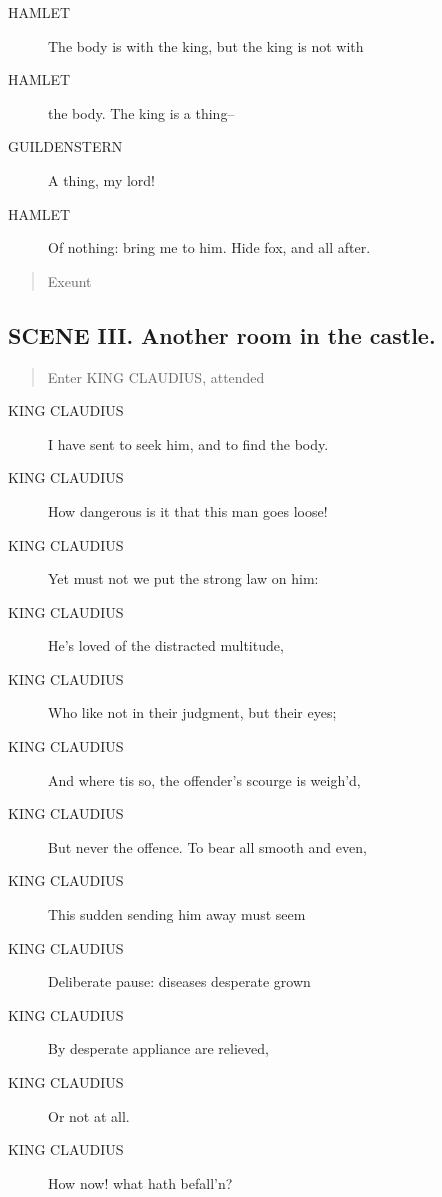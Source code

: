\documentclass{article}
\begin{document}
\begin{description}
            
\item[HAMLET] The body is with the king, but the king is not with
\item[HAMLET] the body. The king is a thing--
\end{description}
          
\begin{description}
            
\item[GUILDENSTERN] A thing, my lord!
\end{description}
          
\begin{description}
            
\item[HAMLET] Of nothing: bring me to him. Hide fox, and all after.
\end{description}
          
\begin{quote}
Exeunt
\end{quote}
          
\subsection{SCENE III.  Another room in the castle.}
          
\begin{quote}
Enter KING CLAUDIUS, attended
\end{quote}
          
\begin{description}
            
\item[KING CLAUDIUS] I have sent to seek him, and to find the body.
\item[KING CLAUDIUS] How dangerous is it that this man goes loose!
\item[KING CLAUDIUS] Yet must not we put the strong law on him:
\item[KING CLAUDIUS] He's loved of the distracted multitude,
\item[KING CLAUDIUS] Who like not in their judgment, but their eyes;
\item[KING CLAUDIUS] And where tis so, the offender's scourge is weigh'd,
\item[KING CLAUDIUS] But never the offence. To bear all smooth and even,
\item[KING CLAUDIUS] This sudden sending him away must seem
\item[KING CLAUDIUS] Deliberate pause: diseases desperate grown
\item[KING CLAUDIUS] By desperate appliance are relieved,
\item[KING CLAUDIUS] Or not at all.
\item[KING CLAUDIUS] How now! what hath befall'n?
\end{description}
          
\end{document}
